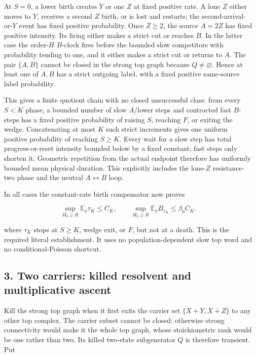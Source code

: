 At \(S=0\), a lower birth creates \(Y\) or one \(Z\) at fixed positive
rate. A lone \(Z\) either moves to \(Y\), receives a second \(Z\) birth,
or is lost and restarts; the second-arrival-or-\(Y\) event has fixed
positive probability. Once \(Z\ge2\), the source \(A=2Z\) has fixed
positive intensity. Its firing either makes a strict cut or reaches
\(B\). In the latter case the order-\(H\) \(B\)-clock fires before the
bounded slow competitors with probability tending to one, and it either
makes a strict cut or returns to \(A\). The pair \(\{A,B\}\) cannot be
closed in the strong top graph because \(Q\ne\varnothing\). Hence at
least one of \(A,B\) has a strict outgoing label, with a fixed positive
same-source label probability.

This gives a finite quotient chain with no closed unsuccessful class:
from every \(S<K\) phase, a bounded number of slow \(A\)/lower steps and
contracted fast \(B\)-steps has a fixed positive probability of raising
\(S\), reaching \(F\), or exiting the wedge. Concatenating at most \(K\)
such strict increments gives one uniform positive probability of
reaching \(S\ge K\). Every wait for a slow step has total
progress-or-reset intensity bounded below by a fixed constant; fast
steps only shorten it. Geometric repetition from the actual endpoint
therefore has uniformly bounded mean physical duration. This explicitly
includes the lone-\(Z\) resistance-two phase and the neutral
\(A\leftrightarrow B\) loop.

In all cases the constant-rate birth compensator now proves

\[
 \sup_{H_0\ge R}\mathbb E_x\tau_K\le C_K,\qquad
 \sup_{H_0\ge R}\mathbb E_xB_{\tau_K}\le \beta_0 C_K.                \tag{2.6}
\]

where \(\tau_K\) stops at \(S\ge K\), wedge exit, or \(F\), but not at a
death. This is the required literal establishment. It uses no
population-dependent slow top word and no conditional-Poisson shortcut.

\subsection{3. Two carriers: killed resolvent and multiplicative
ascent}

Kill the strong top graph when it first exits the carrier set
\(\{X+Y,X+Z\}\) to any other top complex. The carrier subset cannot be
closed: otherwise strong connectivity would make it the whole top graph,
whose stoichiometric rank would be one rather than two. Its killed
two-state subgenerator \(Q\) is therefore transient. Put

